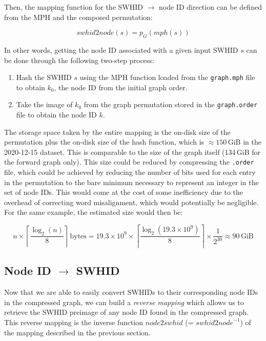 Then, the mapping function for the \gls{SWHID} $\to$ node ID direction can be
defined from the \gls{MPH} and the composed permutation:

\[\mathit{swhid2node}(s) = p_G(\mathit{mph}(s))\]

In other words, getting the node ID associated with a given input \gls{SWHID}
$s$ can be done through the following two-step process:

\begin{enumerate}
    \item Hash the \gls{SWHID} $s$ using the \gls{MPH} function loaded from the
        \texttt{graph.mph} file to obtain $k_0$, the node ID from the initial
        graph order.
    \item Take the image of $k_0$ from the graph permutation stored in the
        \texttt{graph.order} file to obtain the node ID $k$.
\end{enumerate}

The storage space taken by the entire mapping is the on-disk size of the
permutation plus the on-disk size of the hash function, which is $\approx
150$\,GiB in the 2020-12-15 dataset. This is comparable to the size of the
graph itself (134\,GiB for the forward graph only). This size could be reduced
by compressing the \texttt{.order} file, which could be achieved by reducing
the number of bits used for each entry in the permutation to the bare minimum
necessary to represent an integer in the set of node IDs. This would come at
the cost of some inefficiency due to the overhead of correcting word
misalignment, which would potentially be negligible.
For the same example, the estimated size would then be:

\[
    n \times \left\lceil{\frac{\log_2(n)}{8}}\right\rceil\,\mathrm{bytes}
    = 19.3 \times 10^9 \times
        \left\lceil{\frac{\log_2(19.3 \times 10^9)}{8}}\right\rceil
        \times \frac{1}{2^{30}}
    \approx 90\,\mathrm{GiB}
\]

\subsection{Node ID $\to$ SWHID}%
\label{sec:node2swhid}

Now that we are able to easily convert \glspl{SWHID} to their corresponding
node IDs in the compressed graph, we can build a \emph{reverse mapping} which
allows us to retrieve the \gls{SWHID} preimage of any node ID found in the
compressed graph. This reverse mapping is the inverse function
$\mathit{node2swhid}$ (= $\mathit{swhid2node}^{-1}$) of the mapping
described in the previous section.


